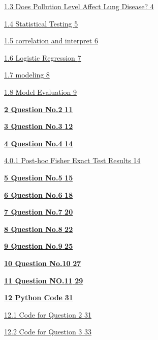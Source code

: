 \hyperref[does-pollution-level-affect-lung-disease]{1.3 Does Pollution
Level Affect Lung Disease?
\hyperref[does-pollution-level-affect-lung-disease]{4}}

\hyperref[statistical-testing]{1.4 Statistical Testing
\hyperref[statistical-testing]{5}}

\hyperref[correlation-and-interpret]{1.5 correlation and interpret
\hyperref[correlation-and-interpret]{6}}

\hyperref[logistic-regression]{1.6 Logistic Regression
\hyperref[logistic-regression]{7}}

\hyperref[modeling]{1.7 modeling \hyperref[modeling]{8}}

\hyperref[model-evaluation]{1.8 Model Evaluation
\hyperref[model-evaluation]{9}}

\hyperref[question-no.2]{\textbf{2 Question No.2}
\hyperref[question-no.2]{\textbf{11}}}

\hyperref[question-no.3]{\textbf{3 Question No.3}
\hyperref[question-no.3]{\textbf{12}}}

\hyperref[question-no.4]{\textbf{4 Question No.4}
\hyperref[question-no.4]{\textbf{14}}}

\hyperref[post-hoc-fisher-exact-test-results]{4.0.1 Post-hoc Fisher
Exact Test Results \hyperref[post-hoc-fisher-exact-test-results]{14}}

\hyperref[question-no.5]{\textbf{5 Question No.5}
\hyperref[question-no.5]{\textbf{15}}}

\hyperref[question-no.6]{\textbf{6 Question No.6}
\hyperref[question-no.6]{\textbf{18}}}

\hyperref[question-no.7]{\textbf{7 Question No.7}
\hyperref[question-no.7]{\textbf{20}}}

\hyperref[question-no.8]{\textbf{8 Question No.8}
\hyperref[question-no.8]{\textbf{22}}}

\hyperref[question-no.9]{\textbf{9 Question No.9}
\hyperref[question-no.9]{\textbf{25}}}

\hyperref[question-no.10]{\textbf{10 Question No.10}
\hyperref[question-no.10]{\textbf{27}}}

\hyperref[question-no.11]{\textbf{11 Question NO.11}
\hyperref[question-no.11]{\textbf{29}}}

\hyperref[python-code]{\textbf{12 Python Code}
\hyperref[python-code]{\textbf{31}}}

\hyperref[code-for-question-2]{12.1 Code for Question 2
\hyperref[code-for-question-2]{31}}

\hyperref[code-for-question-3]{12.2 Code for Question 3
\hyperref[code-for-question-3]{33}}

